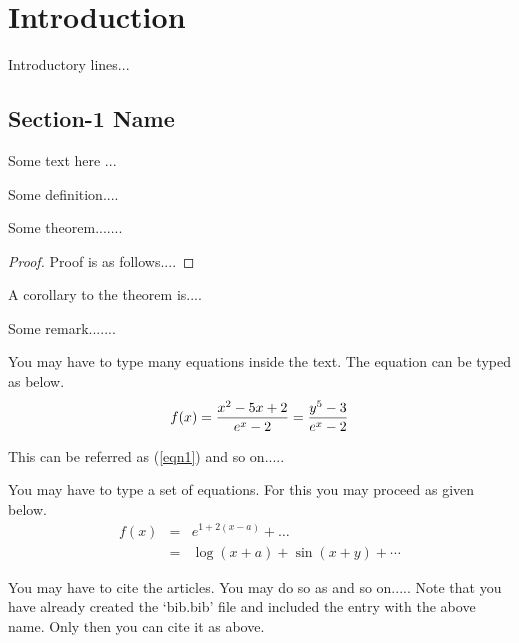 \chapter{Introduction}

Introductory lines...



\section{Section-1 Name}

Some text here ...

\begin{definition}\label{abc}
Some definition....
\end{definition}

\begin{theorem}
Some theorem.......
\end{theorem}

\begin{proof}
Proof is as follows....
\end{proof}


\begin{corollary}
A corollary to the theorem is....
\end{corollary}

\begin{remark}
Some remark.......
\end{remark}


You may have to type many equations inside the text.  The equation can be typed as below.
\begin{equation}\label{eqn1}
f(x) = \frac{x^2-5x+2}{e^x - 2} = {y^5-3 \over e^x-2} %
\end{equation}

This can be referred as (\ref{eqn1}) and so on.....

You may have to type a set of equations.  For this you may proceed as given below.
\begin{eqnarray}
f(x) &=& e^{1+2(x-a)} + \ldots   \nonumber   \\
  &=& \log(x+a) + \sin(x+y) + \cdots  \label{eqn2}
\end{eqnarray}


You may have to cite the articles.  You may do so as \cite{golub} and so on.....
Note that you have already created the `bib.bib' file and included the entry with the above name. Only
then you can cite it as above.  

